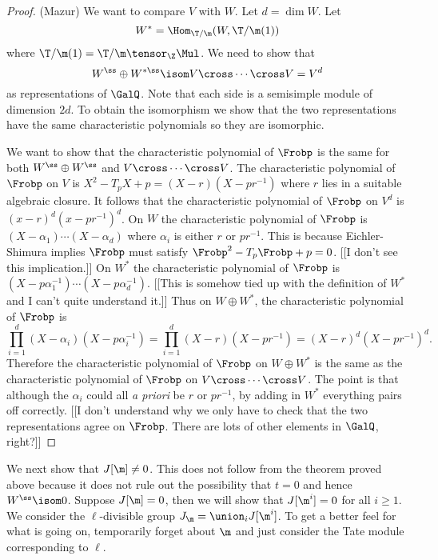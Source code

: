 \documentclass{report}
\begin{document}
\begin{proof} (Mazur)
We want to compare $V$ with $W$. Let $d=\dim W$. Let
$$W^*=\Hom_{\T/\m}(W,\T/\m(1))$$
where $\T/\m(1)=\T/\m\tensor_{\Z}\Mul$.
We need to show that
$$W^{\ss}\oplus W^{*\ss}\isom V\cross\cdots\cross V=V^{d}$$
as representations of $\GalQ$.
Note that each side is a semisimple module of dimension $2d$.
To obtain the isomorphism we show that the two representations
have the same characteristic polynomials so they are isomorphic.

We want to show that the characteristic polynomial of $\Frobp$
is the same for both $W^{\ss}\oplus W^{\*\ss}$ and $V\cross\cdots\cross V$.
The characteristic polynomial of $\Frobp$ on $V$ is
$X^2-T_pX+p=(X-r)(X-pr^{-1})$ where $r$ lies in a suitable
algebraic closure. It follows that the characteristic
polynomial of $\Frobp$ on $V^d$ is $(x-r)^d(x-pr^{-1})^d$.
On $W$ the characteristic polynomial of $\Frobp$ is
$(X-\alpha_1)\cdots(X-\alpha_d)$ where
$\alpha_i$ is either $r$ or $pr^{-1}$. This is because Eichler-Shimura
implies $\Frobp$ must satisfy $\Frobp^2-T_p\Frobp+p=0$.
[[I don't see this implication.]]
On $W^{*}$ the characteristic polynomial of $\Frobp$ is
$(X-p\alpha_1^{-1})\cdots(X-p\alpha_d^{-1})$. [[This is
somehow tied up with the definition of $W^{*}$ and I can't
quite understand it.]] Thus on $W\oplus W^{*}$, the
characteristic polynomial of $\Frobp$ is
$$\prod_{i=1}^{d}(X-\alpha_i)(X-p\alpha_i^{-1})=
             \prod_{i=1}^d(X-r)(X-pr^{-1})=(X-r)^d(X-pr^{-1})^d.$$
Therefore the characteristic polynomial of $\Frobp$ on $W\oplus W^{*}$
is the same as the characteristic polynomial of $\Frobp$ on
$V\cross\cdots\cross V$.
The point is that although the $\alpha_i$ could all {\em a priori} be
$r$ or $pr^{-1}$, by adding in $W^*$ everything pairs off correctly.
[[I don't understand why we only have to check that the two representations
agree on $\Frobp$. There are lots of other elements in $\GalQ$, right?]]
\end{proof}

We next show that $J[\m]\neq 0$. This does not follow from the
theorem proved above because it does not rule out the possibility
that $t=0$ and hence $W^{\ss}\isom 0$.
Suppose $J[\m]=0$, then we will show that $J[\m^i]=0$ for all $i\geq 1$.
We consider the $\ell$-divisible
group $J_{\m}=\union_i J[\m^i]$. To get a better feel for what is going
on, temporarily forget about
$\m$ and just consider the Tate module corresponding to $\ell$.
\end{document}
